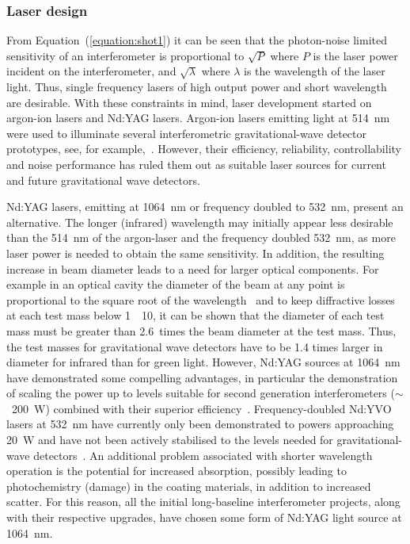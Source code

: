 \subsubsection{Laser design}
\label{subsubsection:laserdesign} 

From Equation~(\ref{equation:shot1}) it can be seen that the photon-noise
limited sensitivity of an interferometer is proportional to $\sqrt{P}$ where $P$
is the laser power incident on the interferometer, and $\sqrt{\lambda}$ where
$\lambda$ is the wavelength of the laser light. Thus, single frequency lasers of
high output power and short wavelength are desirable. With these constraints in
mind, laser development started on argon-ion lasers and Nd:YAG lasers.
Argon-ion lasers emitting light at 514~nm were used to illuminate several
interferometric gravitational-wave detector prototypes, see, for
example,~\cite{Shoemaker, Robertson}.  However, their efficiency, reliability,
controllability and noise performance has ruled them out as suitable laser
sources for current and future gravitational wave detectors.


Nd:YAG lasers, emitting at 1064~nm or frequency doubled to 532~nm, present an
alternative. The longer (infrared) wavelength may initially appear less
desirable than the 514~nm of the argon-laser and the frequency doubled
532~nm, as more laser power is needed to obtain the same sensitivity.  In
addition, the resulting increase in beam diameter leads to a need for larger
optical components. For example in an optical cavity the diameter of the beam at
any point is proportional to the square root of the wavelength~\cite{Kogelnik}
and to keep diffractive losses at each test mass below
1~\texttimes~10, it can be shown that the diameter of each
test mass must be greater than 2.6~times the beam diameter at the test
mass. Thus, the test masses for gravitational wave detectors have to be
1.4 times larger in diameter for infrared than for green light. However, Nd:YAG
sources at 1064~nm have demonstrated some compelling
advantages, in particular the demonstration of scaling the power up to
levels suitable for second generation interferometers ($\sim$~200~W)
combined with their superior
efficiency~\cite{Shine,Vogt,Kerr}. Frequency-doubled Nd:YVO lasers at
532~nm have currently only been demonstrated to powers approaching
20~W and have not been actively stabilised to the levels needed for
gravitational-wave detectors~\cite{Mavalvala:2010}. An additional
problem associated with shorter wavelength operation is the potential
for increased absorption, possibly leading to photochemistry (damage)
in the coating materials, in addition to increased scatter. For this
reason, all the initial long-baseline interferometer projects,
along with their respective upgrades, have chosen some form of Nd:YAG
light source at 1064~nm.


